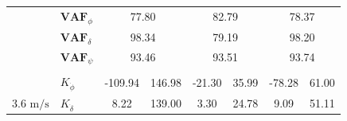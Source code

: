 \begin{table}[]
\begin{tabular}{llcccccc}
                                                   & $\mathbf{VAF}_\phi$                                                & \multicolumn{2}{c}{77.80}                                                                         & \multicolumn{2}{c}{82.79}                                                                         & \multicolumn{2}{c}{78.37}                                                                         \\
                                                   & $\mathbf{VAF}_\delta$                                              & \multicolumn{2}{c}{98.34}                                                                         & \multicolumn{2}{c}{79.19}                                                                         & \multicolumn{2}{c}{98.20}                                                                         \\
                                                   & $\mathbf{VAF}_\psi$                                                & \multicolumn{2}{c}{93.46}                                                                         & \multicolumn{2}{c}{93.51}                                                                         & \multicolumn{2}{c}{93.74}                                                                         \\
                                                   &                                                                    & \multicolumn{1}{l}{}                        & \multicolumn{1}{l}{}                                & \multicolumn{1}{l}{}                        & \multicolumn{1}{l}{}                                & \multicolumn{1}{l}{}                        & \multicolumn{1}{l}{}                                \\ \hline
                                                   & $K_{\dot{\phi}} $                                                  & -109.94                                     & 146.98                                              & -21.30                                      & 35.99                                               & -78.28                                      & 61.00                                               \\
    \multirow{-2}{*}{3.6 $\si{\meter\per\second}$} & $K_{\dot{\delta}}$                                                 & 8.22                                        & 139.00                                              & 3.30                                        & 24.78                                               & 9.09                                        & 51.11                                               \\

\end{tabular}
\end{table}
